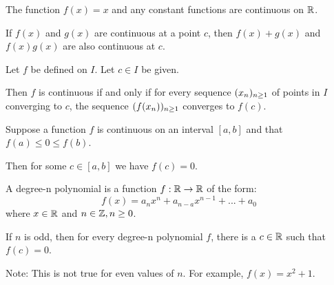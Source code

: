 \begin{lemma}
    The function $f(x)=x$ and any constant functions are continuous on $\mathbb{R}$.
\end{lemma}


\begin{prop}
    If $f(x)$ and $g(x)$ are continuous at a point $c$, then $f(x)+g(x)$ and
    $f(x)g(x)$ are also continuous at $c$.
\end{prop}


\begin{prop}
    Let $f$ be defined on $I$. Let $c \in I$ be given.

    Then $f$ is continuous if and only if for every sequence $(x_n)_{n\geq1}$ of points
    in $I$ converging to $c$, the sequence $(f(x_n))_{n \geq 1}$ converges to $f(c)$.
\end{prop}


\begin{theorem}
    Suppose a function $f$ is continuous on an interval $[a,b]$ and that 
    $f(a) \leq 0 \leq f(b)$.

    Then for some $c \in [a,b]$ we have $f(c)=0$.
\end{theorem}
    

\begin{defn}[Polynomial]
    A degree-n polynomial is a function $f:\mathbb{R} \to \mathbb{R}$ of the form:
    \[f(x) = a_n x^n + a_{n-a} x^{n-1} + ... + a_0\]
    where $x \in \mathbb{R}$ and $n \in \mathbb{Z}, n \geq 0$.
\end{defn}

\begin{theorem}
    If $n$ is odd, then for every degree-n polynomial $f$, there is a $c \in \mathbb{R}$ 
    such that $f(c)=0$.

    Note: This is not true for even values of $n$. For example, $f(x) = x^2 + 1$.
\end{theorem}
